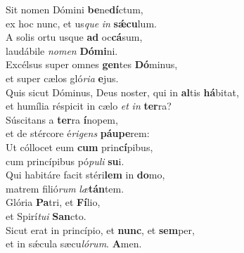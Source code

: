 \evenverse Sit nomen Dómini \textbf{be}ne\textbf{dí}ctum,~\*\\
\evenverse ex hoc nunc, et us\textit{que} \textit{in} \textbf{sǽ}\textbf{cu}lum.\\
\oddverse A solis ortu usque \textbf{ad} oc\textbf{cá}sum,~\*\\
\oddverse laudábile \textit{no}\textit{men} \textbf{Dó}\textbf{mi}ni.\\
\evenverse Excélsus super omnes \textbf{gen}tes \textbf{Dó}minus,~\*\\
\evenverse et super cælos gló\textit{ri}\textit{a} \textbf{e}jus.\\
\oddverse Quis sicut Dóminus, Deus noster, qui in \textbf{al}tis \textbf{há}bitat,~\*\\
\oddverse et humília réspicit in cælo \textit{et} \textit{in} \textbf{ter}ra?\\
\evenverse Súscitans a \textbf{ter}ra \textbf{í}nopem,~\*\\
\evenverse et de stércore é\textit{ri}\textit{gens} \textbf{páu}\textbf{pe}rem:\\
\oddverse Ut cóllocet eum \textbf{cum} prin\textbf{cí}pibus,~\*\\
\oddverse cum princípibus pó\textit{pu}\textit{li} \textbf{su}i.\\
\evenverse Qui habitáre facit stéri\textbf{lem} in \textbf{do}mo,~\*\\
\evenverse matrem filió\textit{rum} \textit{læ}\textbf{tán}tem.\\
\oddverse Glória \textbf{Pa}tri, et \textbf{Fí}lio,~\*\\
\oddverse et Spirí\textit{tu}\textit{i} \textbf{San}cto.\\
\evenverse Sicut erat in princípio, et \textbf{nunc}, et \textbf{sem}per,~\*\\
\evenverse et in sǽcula sæcu\textit{ló}\textit{rum}. \textbf{A}men.\\
